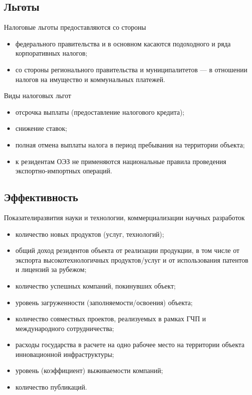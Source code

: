\documentclass[_Venture_p3.tex]{subfiles}
\begin{document}
\subsection{Льготы}

\begin{frame}[allowframebreaks]{Налоговые льготы }{предоставляются со стороны}
\begin{itemize}
	\item федерального правительства и в основном касаются подоходного и ряда корпоративных налогов;
	\item со стороны регионального правительства и муниципалитетов — в отношении налогов на имущество и коммунальных платежей.
\end{itemize}
\end{frame}

\begin{frame}[allowframebreaks]{Виды налоговых льгот}{}
\begin{itemize}
	\item отсрочка выплаты (предоставление налогового кредита);
	\item снижение ставок;

	\pagebreak
	\item полная отмена выплаты налога в период пребывания на территории объекта;
	\item к резидентам ОЭЗ не применяются национальные правила проведения экспортно-импортных операций.
\end{itemize}
\end{frame}

\subsection{Эффективность}
\begin{frame}[allowframebreaks]{Показатели}{развития науки и технологии, коммерциализации научных разработок}
\begin{itemize}
	\item количество новых продуктов (услуг, технологий);
	\item общий доход резидентов объекта от реализации продукции, в том числе от экспорта высокотехнологичных продуктов/услуг и от использования патентов и лицензий за рубежом;
	
	\pagebreak
	\item количество успешных компаний, покинувших объект;
	\item уровень загруженности (заполняемости/освоения) объекта;
	
	\pagebreak
	\item количество совместных проектов, реализуемых в рамках ГЧП и международного сотрудничества;
	\item расходы государства в расчете на одно рабочее место на территории объекта инновационной инфраструктуры;
	
	\pagebreak
	\item уровень (коэффициент) выживаемости компаний;
	\item количество публикаций.
\end{itemize}
\end{frame}
\end{document}
